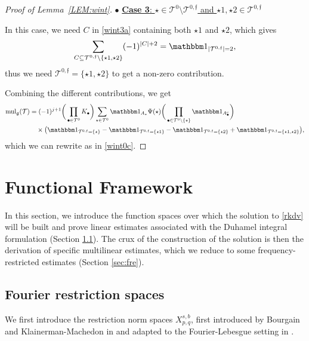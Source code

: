 \documentclass[%
11pt,  reqno]{amsart}
\newcommand{\5}{\textup{V}}
\newcommand{\noi}{\noindent}
\newcommand{\ind}{\mathbbm 1}
\theoremstyle{remark}
\newcommand{\bul}{\bullet}
\newcommand{\TT}{\mathcal{T}}
\newcommand{\gfrak}{\mathfrak{g}}
\newcommand{\ff}{\mathfrak{f}}
\DeclareMathOperator{\mul}{mul}
\numberwithin{equation}{section}
\numberwithin{theorem}{section}
\begin{document}
\begin{proof}[Proof of Lemma~\ref{LEM:wint}]
\noi
$\bul$ \underline{\textbf{Case 3}: $\star \in \TT^{0} \setminus \TT^{0,\ff}$ and $\star1,\star2\in \TT^{0,\ff}$}

In this case, we need $C$ in \eqref{wint3a} containing both $\star1$ and $\star2$, which gives
\begin{align}
\sum_{C\subseteq \TT^{0,\ff} \setminus\{\star1, \star2\}} (-1)^{|C|+2} = \ind_{|\TT^{0,\ff}|=2}, 
\end{align}
thus we need $\TT^{0,\ff} = \{\star1, \star2\}$ to get a non-zero contribution.

Combining the different contributions, we get
\begin{align}
{\mul}_\gfrak (\TT) 
& =
(-1)^{j+1}
		\bigg( \prod_{\bul \in \TT^0} K_\bul \bigg) 
 \sum_{\star \in \TT^0} \ind_{A_\star} \Psi(\star)
		\bigg( \prod_{\bul\in\TT^0 \setminus\{\star\}} \ind_{A_\bul^c}\bigg)
\\
&
\quad \times 
 \big( 
\ind_{ \TT^{0,\ff}  = \{\star\}} 
- \ind_{ \TT^{0,\ff}  = \{\star1\}}  
- \ind_{ \TT^{0,\ff}  = \{\star2\}} 
+\ind_{ \TT^{0,\ff}  = \{\star1, \star2\}}
\big)
,
\end{align}
which we can rewrite as in  \eqref{wint0c}.
\qedhere


	
\end{proof}


	\section{Functional Framework}
	
	In this section, we introduce the function spaces over which the solution to \eqref{rkdv} will be built and prove linear estimates associated with the Duhamel integral formulation (Section \ref{sec:fourier_restr}). The crux of the  construction of the solution is then the derivation of specific multilinear estimates, which we reduce to some frequency-restricted estimates (Section \ref{sec:fre}).
	
	
	\subsection{Fourier restriction spaces}\label{sec:fourier_restr}
	
	We first introduce the restriction norm spaces $X^{s,b}_{p,q}$, first introduced by Bourgain \cite{bourg1, bourg2} and Klainerman-Machedon in \cite{KlainermanMachedon} and adapted to the Fourier-Lebesgue setting in \cite{Grunrock_mkdv, HerrGrunrock_FL}.
	
\end{document}
